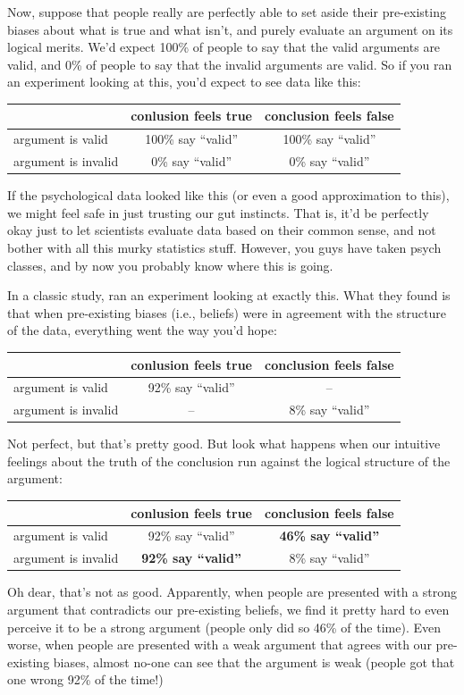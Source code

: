\documentclass[]{book}
\begin{document}
Now, suppose that people really are perfectly able to set aside their pre-existing biases about what is true and what isn't, and purely evaluate an argument on its logical merits. We'd expect 100\% of people to say that the valid arguments are valid, and 0\% of people to say that the invalid arguments are valid. So if you ran an experiment looking at this, you'd expect to see data like this:

\begin{longtable}[]{@{}lcc@{}}
\toprule
& conlusion feels true & conclusion feels false\tabularnewline
\midrule
\endhead
argument is valid & 100\% say ``valid'' & 100\% say ``valid''\tabularnewline
argument is invalid & 0\% say ``valid'' & 0\% say ``valid''\tabularnewline
\bottomrule
\end{longtable}

If the psychological data looked like this (or even a good approximation to this), we might feel safe in just trusting our gut instincts. That is, it'd be perfectly okay just to let scientists evaluate data based on their common sense, and not bother with all this murky statistics stuff. However, you guys have taken psych classes, and by now you probably know where this is going.

In a classic study, \citet{Evans1983} ran an experiment looking at exactly this. What they found is that when pre-existing biases (i.e., beliefs) were in agreement with the structure of the data, everything went the way you'd hope:

\begin{longtable}[]{@{}lcc@{}}
\toprule
& conlusion feels true & conclusion feels false\tabularnewline
\midrule
\endhead
argument is valid & 92\% say ``valid'' & --\tabularnewline
argument is invalid & -- & 8\% say ``valid''\tabularnewline
\bottomrule
\end{longtable}

Not perfect, but that's pretty good. But look what happens when our intuitive feelings about the truth of the conclusion run against the logical structure of the argument:

\begin{longtable}[]{@{}lcc@{}}
\toprule
& conlusion feels true & conclusion feels false\tabularnewline
\midrule
\endhead
argument is valid & 92\% say ``valid'' & \textbf{46\% say ``valid''}\tabularnewline
argument is invalid & \textbf{92\% say ``valid''} & 8\% say ``valid''\tabularnewline
\bottomrule
\end{longtable}

Oh dear, that's not as good. Apparently, when people are presented with a strong argument that contradicts our pre-existing beliefs, we find it pretty hard to even perceive it to be a strong argument (people only did so 46\% of the time). Even worse, when people are presented with a weak argument that agrees with our pre-existing biases, almost no-one can see that the argument is weak (people got that one wrong 92\% of the time!)
\end{document}
